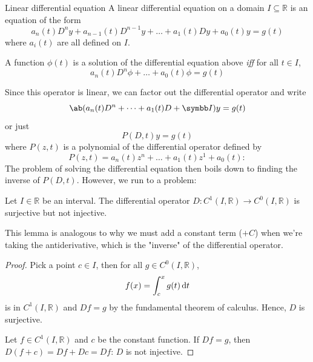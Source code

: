 \begin{df}{Linear differential equation}{}
  A linear differential equation on a domain \(I \subseteq \mathbb{R}\) is an equation of the form
  \begin{equation}
    a_n(t) D^n y + a_{n-1}(t) D^{n-1} y + \dots + a_1(t) Dy + a_0(t)y = g(t)
  \end{equation}
  where \(a_i(t)\) are all defined on \(I\).

  A function \(\phi(t)\) is a solution of the differential equation above \emph{iff}
  for all \(t \in I\),
  \begin{equation}
    a_n(t) D^n \phi + \dots + a_0(t) \phi = g(t)
  \end{equation}
\end{df}
Since this operator is linear, we can factor out the differential operator and write
\begin{equation}
  \ab(a_n(t) D^n + \dots + a_1(t) D + \iden) y = g(t)
\end{equation}
or just
\begin{equation}
  P(D, t)y = g(t)
\end{equation}
where \(P(z, t)\) is a polynomial of the differential operator defined by
\begin{equation}
  P(z, t) = a_n(t) z^n + \dots + a_1(t) z^1 + a_0(t):
\end{equation}
The problem of solving the differential equation then boils down to finding the inverse
of \(P(D, t)\). However, we run to a problem:

\begin{prop}{}{}
  Let \(I \in \mathbb{R}\) be an interval. The differential operator
  \(D: C^1(I, \mathbb{R}) \to C^0(I, \mathbb{R})\) is surjective but not injective.
\end{prop}

This lemma is analogous to why we must add a constant term (\(+ C\)) when we're taking
the antiderivative, which is the "inverse" of the differential operator.

\begin{proof}
  Pick a point \(c \in I\), then for all \(g \in C^0(I, \mathbb{R})\),
  \begin{equation}
    f(x) = \int_c^x g(t) \odif{t}
  \end{equation}
  is in \(C^1(I, \mathbb{R})\) and \(Df = g\) by the fundamental theorem of calculus.
  Hence, \(D\) is surjective.

  Let \(f \in C^1(I, \mathbb{R})\) and \(c\) be the constant function. If \(Df = g\),
  then \(D(f + c) = Df + Dc = Df\): \(D\) is not injective.
\end{proof}

